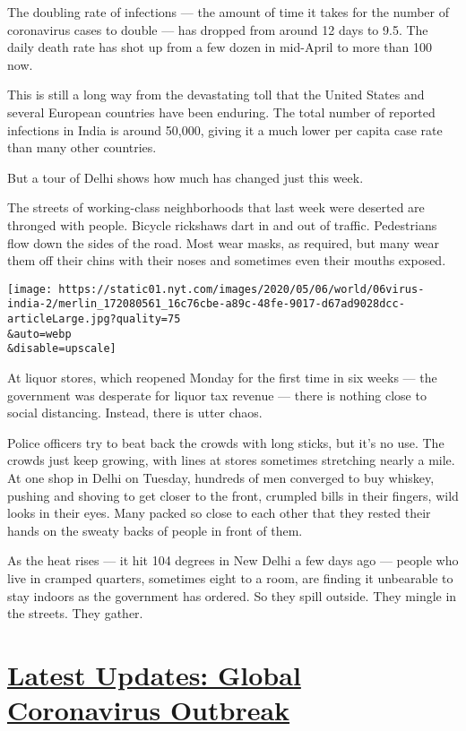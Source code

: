 The doubling rate of infections --- the amount of time it takes for the
number of coronavirus cases to double --- has dropped from around 12
days to 9.5. The daily death rate has shot up from a few dozen in
mid-April to more than 100 now.

This is still a long way from the devastating toll that the United
States and several European countries have been enduring. The total
number of reported infections in India is around 50,000, giving it a
much lower per capita case rate than many other countries.

But a tour of Delhi shows how much has changed just this week.

The streets of working-class neighborhoods that last week were deserted
are thronged with people. Bicycle rickshaws dart in and out of traffic.
Pedestrians flow down the sides of the road. Most wear masks, as
required, but many wear them off their chins with their noses and
sometimes even their mouths exposed.

\texttt{[image: https://static01.nyt.com/images/2020/05/06/world/06virus-india-2/merlin\_172080561\_16c76cbe-a89c-48fe-9017-d67ad9028dcc-articleLarge.jpg?quality=75\\\&auto=webp\\\&disable=upscale]}

At liquor stores, which reopened Monday for the first time in six weeks
--- the government was desperate for liquor tax revenue --- there is
nothing close to social distancing. Instead, there is utter chaos.

Police officers try to beat back the crowds with long sticks, but it's
no use. The crowds just keep growing, with lines at stores sometimes
stretching nearly a mile. At one shop in Delhi on Tuesday, hundreds of
men converged to buy whiskey, pushing and shoving to get closer to the
front, crumpled bills in their fingers, wild looks in their eyes. Many
packed so close to each other that they rested their hands on the sweaty
backs of people in front of them.

As the heat rises --- it hit 104 degrees in New Delhi a few days ago ---
people who live in cramped quarters, sometimes eight to a room, are
finding it unbearable to stay indoors as the government has ordered. So
they spill outside. They mingle in the streets. They gather.

\hypertarget{latest-updates-global-coronavirus-outbreak}{%
\section{\texorpdfstring{\href{https://www.nytimes.com/2020/08/01/world/coronavirus-covid-19.html?action=click\&pgtype=Article\&state=default\&region=MAIN_CONTENT_1\&context=storylines_live_updates}{Latest
Updates: Global Coronavirus
Outbreak}}{Latest Updates: Global Coronavirus Outbreak}}\label{latest-updates-global-coronavirus-outbreak}}

